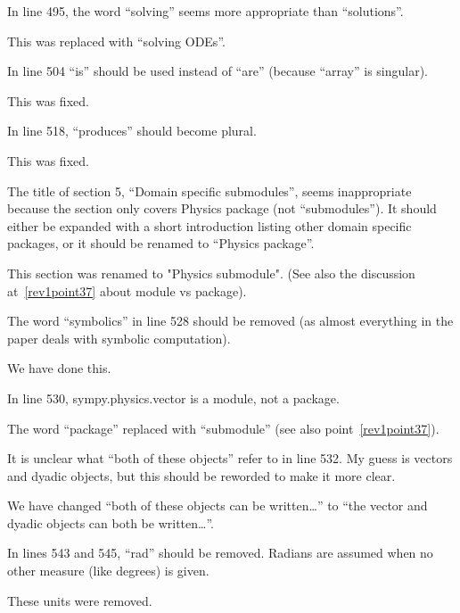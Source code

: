 \documentclass[answers,12pt]{exam}
\begin{document}
\begin{questions}
\question In line 495, the word ``solving'' seems more appropriate than ``solutions''.
\begin{solution}
This was replaced with ``solving ODEs''.
\end{solution}

\question In line 504 ``is'' should be used instead of ``are'' (because ``array'' is singular).
\begin{solution}
This was fixed.
\end{solution}

\question In line 518, ``produces'' should become plural.
\begin{solution}
This was fixed.
\end{solution}

\question The title of section 5, ``Domain specific submodules'', seems inappropriate because the section only covers Physics package (not ``submodules''). It should either be expanded with a short introduction listing other domain specific packages, or it should be renamed to ``Physics package''.
\begin{solution}
\label{rev3point30}
This section was renamed to "Physics submodule".  (See also the
discussion at~\ref{rev1point37} about module vs package).
\end{solution}

\question The word ``symbolics'' in line 528 should be removed (as almost everything in the paper deals with symbolic computation).
\begin{solution}
We have done this.
\end{solution}

\question In line 530, sympy.physics.vector is a module, not a package.
\begin{solution}
The word ``package'' replaced with ``submodule'' (see also point~\ref{rev1point37}).
\end{solution}

\question It is unclear what ``both of these objects'' refer to in line 532. My guess is vectors and dyadic objects, but this should be reworded to make it more clear.
\begin{solution}
We have changed ``both of these objects can be written\ldots'' to ``the vector
and dyadic objects can both be written\ldots''.
\end{solution}

\question In lines 543 and 545, ``rad'' should be removed. Radians are assumed when no other measure (like degrees) is given.
\begin{solution}
These units were removed.
\end{solution}


\end{questions}
\end{document}
